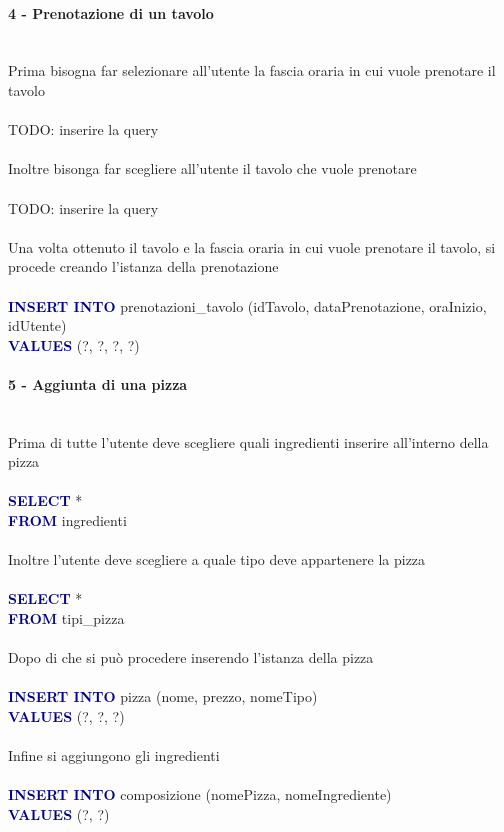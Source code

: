 \documentclass[a4paper,12pt, oneside]{article}
\begin{document}
\paragraph{4 - Prenotazione di un tavolo}
\hphantom{A}\\    %
Prima bisogna far selezionare all'utente la fascia oraria in cui vuole prenotare il tavolo
\\\\
TODO: inserire la query
\\\\
Inoltre bisonga far scegliere all'utente il tavolo che vuole prenotare
\\\\
TODO: inserire la query
\\\\
Una volta ottenuto il tavolo e la fascia oraria in cui vuole prenotare il tavolo, si procede creando l'istanza della prenotazione
\\\\
\textcolor{darkBlue}{\textbf{INSERT INTO}} prenotazioni\_tavolo (idTavolo, dataPrenotazione, oraInizio, idUtente)
\\\textcolor{darkBlue}{\textbf{VALUES}} (?, ?, ?, ?)

\paragraph{5 - Aggiunta di una pizza}
\hphantom{A}\\    %
Prima di tutte l'utente deve scegliere quali ingredienti inserire all'interno della pizza
\\\\
\textcolor{darkBlue}{\textbf{SELECT}} *
\\\textcolor{darkBlue}{\textbf{FROM}} ingredienti
\\\\
Inoltre l'utente deve scegliere a quale tipo deve appartenere la pizza
\\\\
\textcolor{darkBlue}{\textbf{SELECT}} *
\\\textcolor{darkBlue}{\textbf{FROM}} tipi\_pizza
\\\\
Dopo di che si può procedere inserendo l'istanza della pizza
\\\\
\textcolor{darkBlue}{\textbf{INSERT INTO}} pizza (nome, prezzo, nomeTipo)
\\\textcolor{darkBlue}{\textbf{VALUES}} (?, ?, ?)
\\\\
Infine si aggiungono gli ingredienti
\\\\
\textcolor{darkBlue}{\textbf{INSERT INTO}} composizione (nomePizza, nomeIngrediente)
\\\textcolor{darkBlue}{\textbf{VALUES}} (?, ?)
\end{document}
